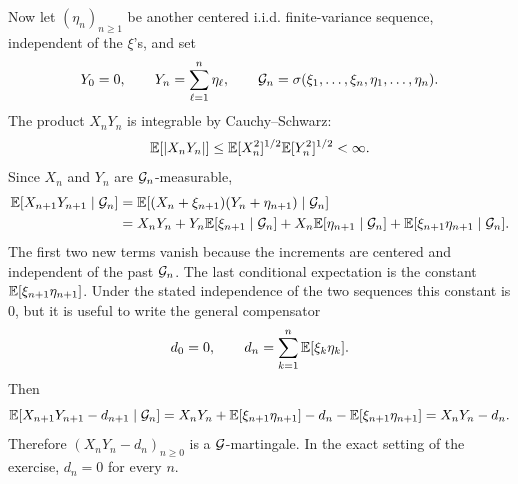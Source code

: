 \begin{solution}
Now let \((\eta_n)_{n\ge 1}\) be another centered i.i.d. finite-variance
sequence, independent of the \(\xi\)'s, and set
\[
  Y_0=0,\qquad Y_n=\sum_{\ell=1}^n \eta_\ell,\qquad
  \mathcal{G}_n=\sigma(\xi_1,\ldots,\xi_n,\eta_1,\ldots,\eta_n).
\]
The product \(X_nY_n\) is integrable by Cauchy--Schwarz:
\[
  \mathbb{E}[|X_nY_n|]\le \mathbb{E}[X_n^2]^{1/2}\mathbb{E}[Y_n^2]^{1/2}<\infty .
\]
Since \(X_n\) and \(Y_n\) are \(\mathcal{G}_n\)-measurable,
\[
\begin{aligned}
  \mathbb{E}[X_{n+1}Y_{n+1}\mid \mathcal{G}_n]
    &=\mathbb{E}[(X_n+\xi_{n+1})(Y_n+\eta_{n+1})\mid \mathcal{G}_n] \\
    &=X_nY_n
      +Y_n\mathbb{E}[\xi_{n+1}\mid \mathcal{G}_n]
      +X_n\mathbb{E}[\eta_{n+1}\mid \mathcal{G}_n]
      +\mathbb{E}[\xi_{n+1}\eta_{n+1}\mid \mathcal{G}_n].
\end{aligned}
\]
The first two new terms vanish because the increments are centered and
independent of the past \(\mathcal{G}_n\).  The last conditional expectation is the
constant \(\mathbb{E}[\xi_{n+1}\eta_{n+1}]\).  Under the stated independence of the
two sequences this constant is \(0\), but it is useful to write the general
compensator
\[
  d_0=0,\qquad d_n=\sum_{k=1}^n \mathbb{E}[\xi_k\eta_k].
\]
Then
\[
  \mathbb{E}[X_{n+1}Y_{n+1}-d_{n+1}\mid \mathcal{G}_n]
    =X_nY_n+\mathbb{E}[\xi_{n+1}\eta_{n+1}]
      -d_n-\mathbb{E}[\xi_{n+1}\eta_{n+1}]
    =X_nY_n-d_n.
\]
Therefore \((X_nY_n-d_n)_{n\ge 0}\) is a \(\mathcal{G}\)-martingale.  In the exact
setting of the exercise, \(d_n=0\) for every \(n\).
\end{solution}
